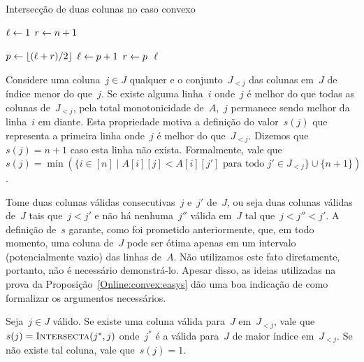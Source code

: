 \begin{algorithm}[h]
\caption{Intersecção de duas colunas no caso convexo}
\label{Online:convex:BB}
\begin{algorithmic}[1]
    \State $\ell \leftarrow 1$
    \State $r \leftarrow n+1$

        \State $p \leftarrow \lfloor(\ell + r)/2\rfloor$
         \label{Online:convex:BB:ineq}
            \State $\ell \leftarrow p + 1$
        \Else
            \State $r \leftarrow p$
        \EndIf
    \EndWhile
    \State \Return $\ell$
\EndFunction
\end{algorithmic}
\end{algorithm}

Considere uma coluna~${ j \in J }$ qualquer e o conjunto~$J_{<j}$ das colunas em~$J$ de índice menor do que~$j$. Se existe alguma linha~$i$ onde~$j$ é melhor do que todas as colunas de~$J_{<j}$, pela total monotonicidade de~$A$,~$j$ permanece sendo melhor da linha~$i$ em diante. Esta propriedade motiva a definição do valor~$s(j)$ que representa a primeira linha onde~$j$ é melhor do que~$J_{<j}$. Dizemos que~$s(j) = n+1$ caso esta linha não exista. Formalmente, vale que~${ s(j) = \min(\{i \in [n] \mid A[i][j] < A[i][j'] \text{ para todo } j' \in J_{<j} \} \cup \{ n+1 \}) }$.

Tome duas colunas válidas consecutivas~$j$ e~$j'$ de~$J$, ou seja duas colunas válidas de~$J$ tais que~$j < j'$ e não há nenhuma~$j''$ válida em~$J$ tal que~${ j < j'' < j' }$. A definição de~$s$ garante, como foi prometido anteriormente, que, em todo momento, uma coluna de~$J$ pode ser ótima apenas em um intervalo (potencialmente vazio) das linhas de~$A$. Não utilizamos este fato diretamente, portanto, não é necessário demonstrá-lo. Apesar disso, as ideias utilizadas na prova da Proposição~\ref{Online:convex:easys} dão uma boa indicação de como formalizar os argumentos necessários.

\begin{prop} \label{Online:convex:easys}
Seja~${ j \in J }$ válido. Se existe uma coluna válida para~$J$ em~${ J_{<j} }$, vale que~${ s(j) = \textsc{Intersecta}(j^*,j) }$ onde~$j^*$ é a válida para~$J$ de maior índice em~${ J_{<j} }$. Se não existe tal coluna, vale que~${ s(j) = 1 }$.
\end{prop}

